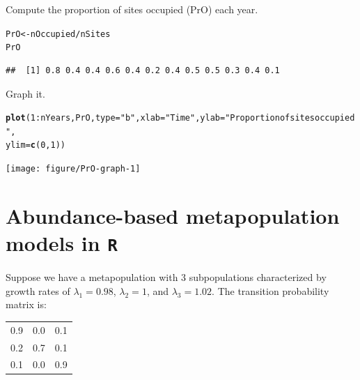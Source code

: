 \documentclass[12pt]{article}\usepackage[]{graphicx}\usepackage[]{color}
\makeatletter
\newcommand{\hlnum}[1]{\textcolor[rgb]{0.686,0.059,0.569}{#1}}%
\newcommand{\hlstr}[1]{\textcolor[rgb]{0.192,0.494,0.8}{#1}}%
\newcommand{\hlopt}[1]{\textcolor[rgb]{0,0,0}{#1}}%
\newcommand{\hlstd}[1]{\textcolor[rgb]{0.345,0.345,0.345}{#1}}%
\newcommand{\hlkwb}[1]{\textcolor[rgb]{0.69,0.353,0.396}{#1}}%
\newcommand{\hlkwc}[1]{\textcolor[rgb]{0.333,0.667,0.333}{#1}}%
\newcommand{\hlkwd}[1]{\textcolor[rgb]{0.737,0.353,0.396}{\textbf{#1}}}%
\newenvironment{kframe}{%
 \def\at@end@of@kframe{}%
 \ifinner\ifhmode%
  \def\at@end@of@kframe{\end{minipage}}%
  \begin{minipage}{\columnwidth}%
 \fi\fi%
 \def\FrameCommand##1{\hskip\@totalleftmargin \hskip-\fboxsep
 \colorbox{shadecolor}{##1}\hskip-\fboxsep
     \hskip-\linewidth \hskip-\@totalleftmargin \hskip\columnwidth}%
 \MakeFramed {\advance\hsize-\width
   \@totalleftmargin\z@ \linewidth\hsize
   \@setminipage}}%
 {\par\unskip\endMakeFramed%
 \at@end@of@kframe}
\newenvironment{knitrout}{}{} %
\makeatother
\begin{document}
\clearpage

Compute the proportion of sites occupied (PrO) each year.
\begin{knitrout}
\color{fgcolor}\begin{kframe}
\begin{alltt}
\hlstd{PrO} \hlkwb{<-} \hlstd{nOccupied} \hlopt{/} \hlstd{nSites}
\hlstd{PrO}
\end{alltt}
\begin{verbatim}
##  [1] 0.8 0.4 0.4 0.6 0.4 0.2 0.4 0.5 0.5 0.3 0.4 0.1
\end{verbatim}
\end{kframe}
\end{knitrout}

Graph it.
\begin{knitrout}
\color{fgcolor}\begin{kframe}
\begin{alltt}
\hlkwd{plot}\hlstd{(}\hlnum{1}\hlopt{:}\hlstd{nYears, PrO,} \hlkwc{type}\hlstd{=}\hlstr{"b"}\hlstd{,} \hlkwc{xlab}\hlstd{=}\hlstr{"Time"}\hlstd{,} \hlkwc{ylab}\hlstd{=}\hlstr{"Proportion of sites occupied"}\hlstd{,}
     \hlkwc{ylim}\hlstd{=}\hlkwd{c}\hlstd{(}\hlnum{0}\hlstd{,} \hlnum{1}\hlstd{))}
\end{alltt}
\end{kframe}
\texttt{[image: figure/PrO-graph-1]} 

\end{knitrout}


\clearpage

\section*{Abundance-based metapopulation models in \texttt{R}}

Suppose we have a metapopulation with 3 subpopulations characterized
by growth rates of $\lambda_1=0.98$, $\lambda_2=1$, and
$\lambda_3=1.02$. The transition probability matrix is:

\begin{table}[h!]
  \centering
  \begin{tabular}{ccc}
    \hline
    0.9 & 0.0 & 0.1 \\
    0.2 & 0.7 & 0.1 \\
    0.1 & 0.0 & 0.9 \\
    \hline
  \end{tabular}
\end{table}
\end{document}

